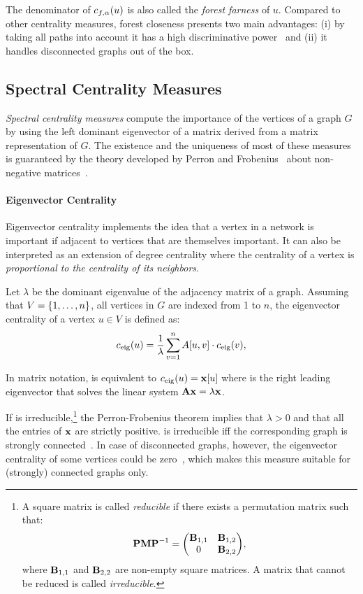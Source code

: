 The denominator of $c_{f,\alpha}(u)$ is also called the \emph{forest farness} of $u$.
Compared to other centrality measures, forest closeness presents two main advantages:
(i) by taking all paths into account it has a high discriminative
power~\cite{DBLP:conf/icdm/JinBZ19} and (ii) it handles disconnected
graphs out of the box.

\subsection{Spectral Centrality Measures}
%
\emph{Spectral centrality measures} compute the importance of the vertices of a
graph $G$ by using the left dominant eigenvector of a matrix derived
from a matrix representation of $G$.
The existence and the uniqueness of most of these measures is guaranteed by the
theory developed by Perron and
Frobenius~\cite{perron1907theorie,frobenius1912matrizen} about non-negative
matrices~\cite{DBLP:books/siam/BermanP94}.

\paragraph{Eigenvector Centrality}
Eigenvector centrality implements the idea that a vertex in a network is
important if adjacent to vertices that are themselves important. It can also be
interpreted as an extension of degree centrality where the centrality of a
vertex is \emph{proportional to the centrality of its neighbors}.

Let $\lambda$ be the dominant eigenvalue of the adjacency matrix \Adj of a
graph. Assuming that $V = \set{1, \ldots, n}$, \ie all vertices
in $G$ are indexed from 1 to $n$, the eigenvector centrality
of a vertex $u \in V$ is defined as:
%
\begin{equation}
\label{eq:prelim:eig-centrality}
c_{\text{eig}}(u) = \frac 1\lambda\sum_{v = 1}^n A[u,v]\cdot c_{\text{eig}}(v),
\end{equation}

In matrix notation,  is equivalent
to $c_{\text{eig}}(u) = \mathbf{x}[u]$ where  is the right leading eigenvector
that solves the linear system
$\mathbf{A}\mathbf{x} = \lambda\mathbf{x}$.

If \Adj is irreducible,\footnote{
A square matrix  is called \emph{reducible} if there exists a
permutation matrix  such that:
%
\[
\mat{PMP}^{-1} =
\begin{pmatrix}
    \mat{B}_{1,1} & \mat{B}_{1,2}\\
    0 & \mat{B}_{2,2}
\end{pmatrix},
\]
%
where $\mathbf{B}_{1,1}$ and $\mathbf{B}_{2,2}$ are non-empty square matrices.
A matrix that cannot be reduced is called \emph{irreducible}.
}
%
the Perron-Frobenius theorem implies that $\lambda > 0$ and that all the
entries of $\mathbf{x}$ are strictly positive. \Adj is irreducible iff the
corresponding graph is strongly connected~\cite{DBLP:books/siam/BermanP94}. In
case of disconnected graphs, however, the eigenvector centrality of some
vertices could be zero~\cite{newman2018networks}, which makes this measure
suitable for (strongly) connected graphs only.

